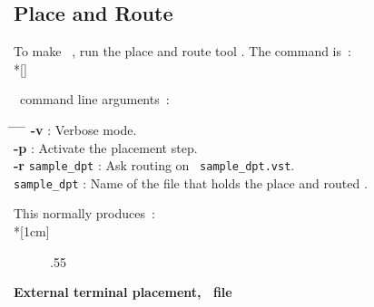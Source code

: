    \subsection{Place and Route}
   \begin{minipage}[t]{\textwidth}
     \forceindent
       To make \datapath\ \layout, run the place and route tool \dpr. The
     command is~:\\*[\bigskipamount]
     \forceindent
     \\
     \bigskip
   \end{minipage}
   \begin{minipage}[t]{\textwidth}
     \forceindent
       \dpr\ command line arguments\footnotemark~:
     \begin{tabbing}
       \samepage
       \hspace{\sizeindentation} \= %
       \hspace{0.5cm}      \= %
       \hspace{2cm}        \= %
       \hspace{0.4cm}      \= \kill
       \> {\bf -v} \> \> : \> Verbose mode.\\
       \> {\bf -p} \> \> : \> Activate the placement step.\\
       \> {\bf -r} \> {\tt sample\_dpt} \> : \> Ask routing on \netlist\
                                             {\tt sample\_dpt.vst}.\\
       \> \> {\tt sample\_dpt} \> : \> Name of the file that holds the
                                       place and routed \layout.
     \end{tabbing}
   \end{minipage}
   \forceindent
     This normally produces~:\\*[1cm]
   \nopagebreak
   \begin{figure}[H]
     \begin{center}
       \leavevmode\epsfxsize.55\textwidth{}
     \end{center}
   \end{figure}
   {\bf External terminal placement, \dprfile\ file}
